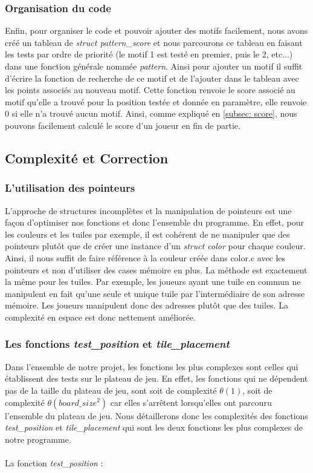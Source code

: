 \documentclass[11pt]{article}
\begin{document}
\subsubsection{Organisation du code}
Enfin, pour organiser le code et pouvoir ajouter des motifs facilement, nous avons créé un tableau de \emph{struct pattern\_score} et nous parcourons ce tableau en faisant les tests par ordre de priorité (le motif 1 est testé en premier, puis le 2, etc...) dans une fonction générale nommée \emph{pattern}. Ainsi pour ajouter un motif il suffit d'écrire la fonction de recherche de ce motif et de l'ajouter dans le tableau avec les points associés au nouveau motif. Cette fonction renvoie le score associé au motif qu'elle a trouvé pour la position testée et donnée en paramètre, elle renvoie 0 si elle n'a trouvé aucun motif. Ainsi, comme expliqué en \ref{subsec: score}, nous pouvons facilement calculé le score d'un joueur en fin de partie.

\subsection{Complexité et Correction}
\subsubsection{L'utilisation des pointeurs}
L’approche de structures incomplètes et la manipulation de pointeurs est une façon d'optimiser nos fonctions et donc l'ensemble du programme. En effet, pour les couleurs et les tuiles par exemple, il est cohérent de ne manipuler que des pointeurs plutôt que de créer une instance d’un \emph{struct color} pour chaque couleur. Ainsi, il nous suffit de faire référence à la couleur créée dans color.c avec les pointeurs et non d'utiliser des cases mémoire en plus. La méthode est exactement la même pour les tuiles. Par exemple, les joueurs ayant une tuile en commun ne manipulent en fait qu'une seule et unique tuile par l'intermédiaire de son adresse mémoire. Les joueurs manipulent donc des adresses plutôt que des tuiles. La complexité en espace est donc nettement améliorée.

\subsubsection{Les fonctions \emph{test\_position} et \emph{tile\_placement}}
Dans l'ensemble de notre projet, les fonctions les plus complexes sont celles qui établissent des tests sur le plateau de jeu. En effet, les fonctions qui ne dépendent pas de la taille du plateau de jeu, sont soit de complexité \( \theta(1) \), soit de complexité \( \theta(board\_size^2) \) car elles s'arrêtent lorsqu'elles ont parcouru l'ensemble du plateau de jeu. Nous détaillerons donc les complexités des fonctions \emph{test\_position} et \emph{tile\_placement} qui sont les deux fonctions les plus complexes de notre programme. \\ \\
La fonction \emph{test\_position} : \\
\end{document}
